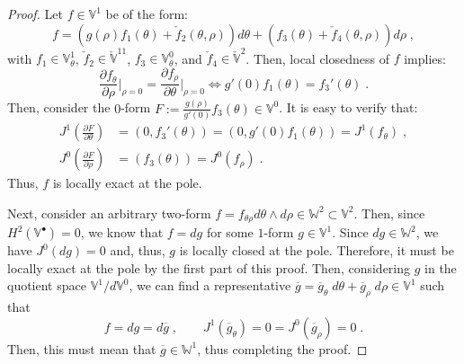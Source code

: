 \documentclass[10pt]{article}
\newcommand{\vSpace}[1]{\mathbb{#1}}
\newcommand{\complex}[1]{\mathit{\vSpace{#1}^\bullet}}
\newcommand{\cU}{\theta}
\newcommand{\cV}{\rho}
\newcommand{\dcU}{\mathit{d\cU}}
\newcommand{\dcV}{\mathit{d\cV}}
\newcommand{\jet}[2]{J^{#1}\left(#2\right)}
\theoremstyle{plain}
\theoremstyle{definition}
\theoremstyle{remark}
\begin{document}
\begin{proof}
    Let $f \in \vSpace{V}^1$ be of the form:
    \begin{equation*}
        f = \left(g(\cV)f_{1}(\cU) + \check{f}_{2}(\cU,\cV)\right)\dcU
            + \left(f_{3}(\cU) + \check{f}_{4}(\cU,\cV)\right)\dcV\;,
    \end{equation*}
    with $f_1 \in \vSpace{V}_\cU^1$, $\check{f}_{2} \in \check{\vSpace{V}}^{11}$, $f_3 \in \vSpace{V}_\cU^0$, and $\check{f}_{4} \in \check{\vSpace{V}}^2$.
    Then, local closedness of $f$ implies:
    \begin{equation*}
        \frac{\partial f_\cU}{\partial\cV}\big|_{\cV=0} = \frac{\partial f_\cV}{\partial\cU}\big|_{\cV=0}
        \Longleftrightarrow 
        g'(0)f_1(\cU) = f_3'(\cU)\;.
    \end{equation*}
    Then, consider the $0$-form $F := \frac{g(\cV)}{g'(0)}f_3(\cU) \in \vSpace{V}^0$.
    It is easy to verify that:
    \begin{equation*}
        \begin{split}
            \jet{1}{\frac{\partial F}{\partial \cU}} &= \left( 0, f_3'(\cU) \right) = \left( 0, g'(0)f_1(\cU) \right) = \jet{1}{f_\cU}\;,\\
            \jet{0}{\frac{\partial F}{\partial \cV}} &= \left( f_3(\cU) \right) = \jet{0}{f_\cV}\;.
        \end{split}
    \end{equation*}
    Thus, $f$ is locally exact at the pole.

    Next, consider an arbitrary two-form $f = f_{\cU\cV} \dcU \wedge \dcV \in \vSpace{W}^2 \subset \vSpace{V}^2$.
    Then, since $H^2(\complex{V}) = 0$, we know that $f = dg$ for some $1$-form $g \in \vSpace{V}^1$.
    Since $dg \in \vSpace{W}^2$, we have $\jet{0}{dg} = 0$ and, thus, $g$ is locally closed at the pole.
    Therefore, it must be locally exact at the pole by the first part of this proof.
    Then, considering $g$ in the quotient space $\vSpace{V}^1 / d\vSpace{V}^0$, 
    we can find a representative $\overline{g} = \overline{g}_\cU\;\dcU + \overline{g}_\cV\;\dcV \in \vSpace{V}^1$ such that
    \begin{equation*}
        f = dg = d\overline{g}\;,\qquad
        \jet{1}{\overline{g}_\cU} = 0 = \jet{0}{\overline{g}_\cV} = 0\;.
    \end{equation*}
    Then, this must mean that $\overline{g} \in \vSpace{W}^1$, thus completing the proof.
\end{proof}
\end{document}
